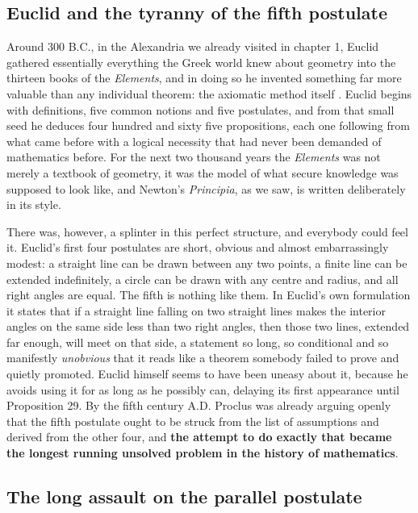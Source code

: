     \subsection{Euclid and the tyranny of the fifth postulate}

        Around 300 B.C., in the Alexandria we already visited in chapter 1, Euclid gathered essentially everything the Greek world knew about geometry into the thirteen books of the \textit{Elements}, and in doing so he invented something far more valuable than any individual theorem: the axiomatic method itself \citep{euclid_elements}. Euclid begins with definitions, five common notions and five postulates, and from that small seed he deduces four hundred and sixty five propositions, each one following from what came before with a logical necessity that had never been demanded of mathematics before. For the next two thousand years the \textit{Elements} was not merely a textbook of geometry, it was the model of what secure knowledge was supposed to look like, and Newton's \textit{Principia}, as we saw, is written deliberately in its style.

        There was, however, a splinter in this perfect structure, and everybody could feel it. Euclid's first four postulates are short, obvious and almost embarrassingly modest: a straight line can be drawn between any two points, a finite line can be extended indefinitely, a circle can be drawn with any centre and radius, and all right angles are equal. The fifth is nothing like them. In Euclid's own formulation it states that if a straight line falling on two straight lines makes the interior angles on the same side less than two right angles, then those two lines, extended far enough, will meet on that side, a statement so long, so conditional and so manifestly \textit{unobvious} that it reads like a theorem somebody failed to prove and quietly promoted. Euclid himself seems to have been uneasy about it, because he avoids using it for as long as he possibly can, delaying its first appearance until Proposition 29. By the fifth century A.D. Proclus was already arguing openly that the fifth postulate ought to be struck from the list of assumptions and derived from the other four, and \textbf{the attempt to do exactly that became the longest running unsolved problem in the history of mathematics}.

    \subsection{The long assault on the parallel postulate}

